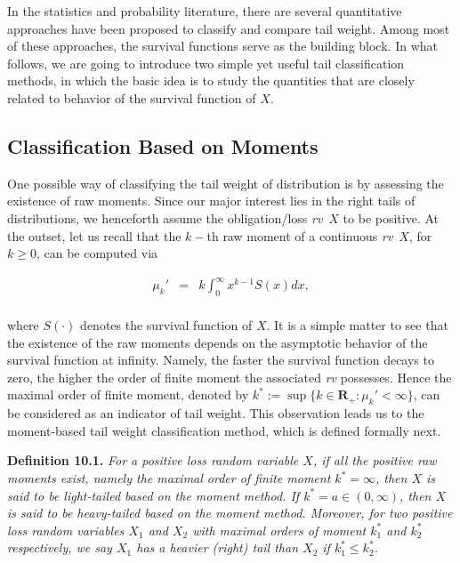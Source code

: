 \documentclass[]{book}
\theoremstyle{definition}
\theoremstyle{definition}
\theoremstyle{definition}
\theoremstyle{remark}
\begin{document}
In the statistics and probability literature, there are several
quantitative approaches have been proposed to classify and compare tail
weight. Among most of these approaches, the survival functions serve as
the building block. In what follows, we are going to introduce two
simple yet useful tail classification methods, in which the basic idea
is to study the quantities that are closely related to behavior of the
survival function of \(X\).

\subsection{Classification Based on
Moments}\label{classification-based-on-moments}

One possible way of classifying the tail weight of distribution is by
assessing the existence of raw moments. Since our major interest lies in
the right tails of distributions, we henceforth assume the
obligation/loss \emph{rv}~\(X\) to be positive. At the outset, let us
recall that the \(k-\)th raw moment of a continuous \emph{rv}~\(X\), for
\(k\geq 0\), can be computed via

\begin{eqnarray*}
    \mu_k' &=& k \int_0^{\infty} x^{k-1} S(x) dx, \\
\end{eqnarray*}

where \(S(\cdot)\) denotes the survival function of \(X\). It is a
simple matter to see that the existence of the raw moments depends on
the asymptotic behavior of the survival function at infinity. Namely,
the faster the survival function decays to zero, the higher the order of
finite moment the associated \emph{rv} possesses. Hence the maximal
order of finite moment, denoted by
\(k^{\ast}:=\sup\{k\in \mathbf{R}_+:\mu_k'<\infty \}\), can be
considered as an indicator of tail weight. This observation leads us to
the moment-based tail weight classification method, which is defined
formally next.

\textbf{Definition 10.1.} \emph{For a positive loss random variable
\(X\), if all the positive raw moments exist, namely the maximal order
of finite moment \(k^{\ast}=\infty\), then \(X\) is said to be
light-tailed based on the moment method. If
\(k^{\ast}=a \in (0,\infty)\), then \(X\) is said to be heavy-tailed
based on the moment method. Moreover, for two positive loss random
variables \(X_1\) and \(X_2\) with maximal orders of moment
\(k^{\ast}_1\) and \(k^{\ast}_2\) respectively, we say \(X_1\) has a
heavier (right) tail than \(X_2\) if \(k^{\ast}_1\leq k^{\ast}_2\).}
\end{document}
